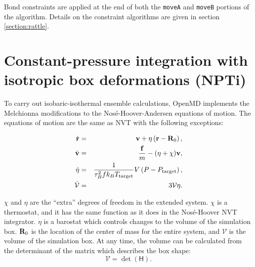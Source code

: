 \documentclass[letterpaper]{report}
\begin{document}
Bond constraints are applied at the end of both the {\tt moveA} and
{\tt moveB} portions of the algorithm.  Details on the constraint
algorithms are given in section \ref{section:rattle}.

\section{\label{sec:NPTi}Constant-pressure integration with 
isotropic box deformations (NPTi)}

To carry out isobaric-isothermal ensemble calculations, OpenMD
implements the Melchionna modifications to the Nos\'e-Hoover-Andersen
equations of motion.\cite{melchionna93} The equations of motion are
the same as NVT with the following exceptions:

\begin{eqnarray}
\dot{{\bf r}} & = & {\bf v} + \eta \left( {\bf r} - {\bf R}_0 \right), \\
\dot{{\bf v}} & = & \frac{{\bf f}}{m} - (\eta + \chi) {\bf v}, \\
\dot{\eta} & = & \frac{1}{\tau_{B}^2 f k_B T_{\mathrm{target}}} V \left( P -
P_{\mathrm{target}} \right), \\
\dot{\mathcal{V}} & = & 3 \mathcal{V} \eta .
\label{eq:melchionna1}
\end{eqnarray}

$\chi$ and $\eta$ are the ``extra'' degrees of freedom in the extended
system.  $\chi$ is a thermostat, and it has the same function as it
does in the Nos\'e-Hoover NVT integrator.  $\eta$ is a barostat which
controls changes to the volume of the simulation box.  ${\bf R}_0$ is
the location of the center of mass for the entire system, and
$\mathcal{V}$ is the volume of the simulation box.  At any time, the
volume can be calculated from the determinant of the matrix which
describes the box shape:
\begin{equation}
\mathcal{V} = \det(\mathsf{H}).
\end{equation}
\end{document}
